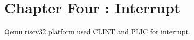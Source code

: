 \newpage
\section{Chapter Four : Interrupt}
Qemu riscv32 platform used CLINT and PLIC for interrupt.
